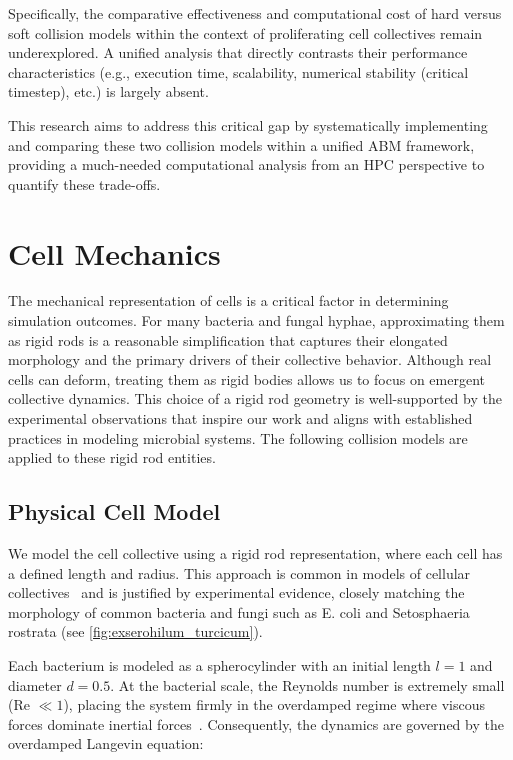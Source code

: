\documentclass[conference]{IEEEtran}
\begin{document}
Specifically, the comparative effectiveness and computational cost of hard versus soft collision models within the context of proliferating cell collectives remain underexplored. A unified analysis that directly contrasts their performance characteristics (e.g., execution time, scalability, numerical stability (critical timestep), etc.) is largely absent.

This research aims to address this critical gap by systematically implementing and comparing these two collision models within a unified ABM framework, providing a much-needed computational analysis from an HPC perspective to quantify these trade-offs.

\section{Cell Mechanics}

The mechanical representation of cells is a critical factor in determining simulation outcomes. For many bacteria and fungal hyphae, approximating them as rigid rods is a reasonable simplification that captures their elongated morphology and the primary drivers of their collective behavior. Although real cells can deform, treating them as rigid bodies allows us to focus on emergent collective dynamics. This choice of a rigid rod geometry is well-supported by the experimental observations that inspire our work and aligns with established practices in modeling microbial systems. The following collision models are applied to these rigid rod entities.

\subsection{Physical Cell Model}

We model the cell collective using a rigid rod representation, where each cell has a defined length and radius. This approach is common in models of cellular collectives~\cite{You2018, Weady2024, Blanchard2015, Warren2019, Ghosh2015} and is justified by experimental evidence, closely matching the morphology of common bacteria and fungi such as E. coli and Setosphaeria rostrata (see \autoref{fig:exserohilum_turcicum}).

Each bacterium is modeled as a spherocylinder with an initial length $l = 1$ and diameter $d = 0.5$. At the bacterial scale, the Reynolds number is extremely small (Re $\ll 1$), placing the system firmly in the overdamped regime where viscous forces dominate inertial forces~\cite{datta2024lifelowreynoldsnumber}. Consequently, the dynamics are governed by the overdamped Langevin equation:
\end{document}
